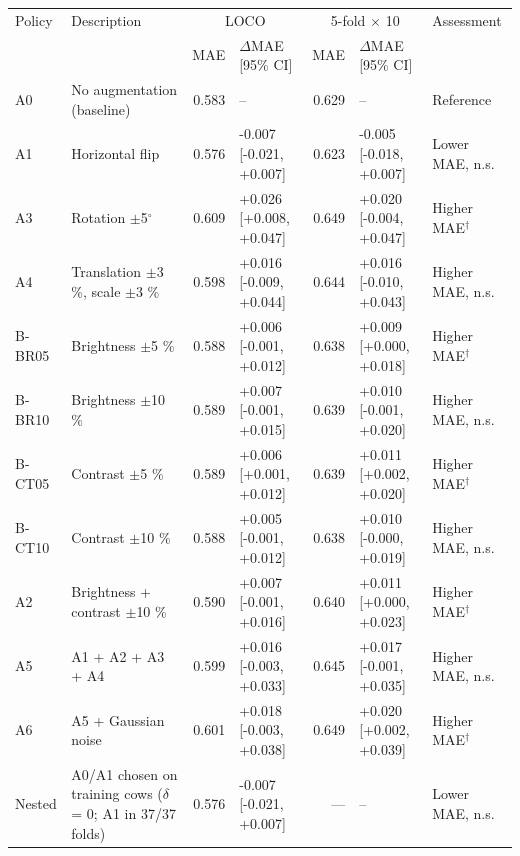 \begin{tabular}{llrlrll}
\hline
Policy & Description & \multicolumn{2}{c}{LOCO} & \multicolumn{2}{c}{5-fold $\times$ 10} & Assessment \\
 & & MAE & $\Delta$MAE [95\% CI] & MAE & $\Delta$MAE [95\% CI] & \\
\hline
A0 & No augmentation (baseline) & 0.583 & -- & 0.629 & -- & Reference \\
A1 & Horizontal flip & 0.576 & -0.007 [-0.021, +0.007] & 0.623 & -0.005 [-0.018, +0.007] & Lower MAE, n.s. \\
A3 & Rotation $\pm$5$^\circ$ & 0.609 & +0.026 [+0.008, +0.047] & 0.649 & +0.020 [-0.004, +0.047] & Higher MAE$^\dagger$ \\
A4 & Translation $\pm$3 \%, scale $\pm$3 \% & 0.598 & +0.016 [-0.009, +0.044] & 0.644 & +0.016 [-0.010, +0.043] & Higher MAE, n.s. \\
B-BR05 & Brightness $\pm$5 \% & 0.588 & +0.006 [-0.001, +0.012] & 0.638 & +0.009 [+0.000, +0.018] & Higher MAE$^\dagger$ \\
B-BR10 & Brightness $\pm$10 \% & 0.589 & +0.007 [-0.001, +0.015] & 0.639 & +0.010 [-0.001, +0.020] & Higher MAE, n.s. \\
B-CT05 & Contrast $\pm$5 \% & 0.589 & +0.006 [+0.001, +0.012] & 0.639 & +0.011 [+0.002, +0.020] & Higher MAE$^\dagger$ \\
B-CT10 & Contrast $\pm$10 \% & 0.588 & +0.005 [-0.001, +0.012] & 0.638 & +0.010 [-0.000, +0.019] & Higher MAE, n.s. \\
A2 & Brightness + contrast $\pm$10 \% & 0.590 & +0.007 [-0.001, +0.016] & 0.640 & +0.011 [+0.000, +0.023] & Higher MAE$^\dagger$ \\
A5 & A1 + A2 + A3 + A4 & 0.599 & +0.016 [-0.003, +0.033] & 0.645 & +0.017 [-0.001, +0.035] & Higher MAE, n.s. \\
A6 & A5 + Gaussian noise & 0.601 & +0.018 [-0.003, +0.038] & 0.649 & +0.020 [+0.002, +0.039] & Higher MAE$^\dagger$ \\
Nested & A0/A1 chosen on training cows ($\delta$ = 0; A1 in 37/37 folds) & 0.576 & -0.007 [-0.021, +0.007] & — & -- & Lower MAE, n.s. \\
\hline
\end{tabular}
